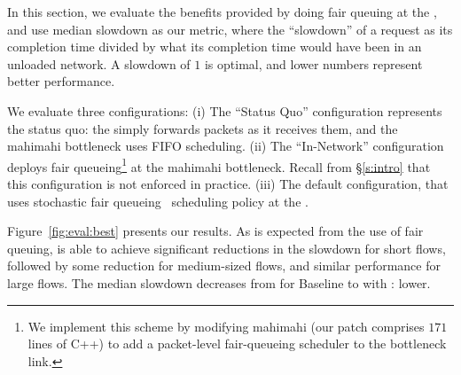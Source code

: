 
\newcommand{\baseline}{Status Quo\xspace}
\newcommand{\optimal}{In-Network\xspace}



In this section, we evaluate the benefits provided by doing fair queuing at the \name, and use median slowdown as our metric, where the ``slowdown'' of a request as its completion time divided by what its completion time would have been in an unloaded network. A slowdown of $1$ is optimal, and lower numbers represent better performance.

We evaluate three configurations: 
(i) The ``\baseline'' configuration represents the status quo: the \inbox simply forwards packets as it receives them, and the mahimahi bottleneck uses FIFO scheduling.
(ii) The ``\optimal'' configuration deploys fair queueing\footnote{
We implement this scheme by modifying mahimahi (our patch comprises $171$ lines of C++) to add a packet-level fair-queueing scheduler to the bottleneck link.}
at the mahimahi bottleneck. 
Recall from \S\ref{s:intro} that this configuration is not enforced in practice.
(iii) The default \name configuration, that uses stochastic fair queueing~\cite{sfq} scheduling policy at the \inbox.


Figure~\ref{fig:eval:best} presents our results. 
As is expected from the use of fair queuing, \name is able to achieve significant reductions in the slowdown for short flows, followed by some reduction for medium-sized flows, and similar performance for large flows. 
The median slowdown
decreases from \overviewBenefitsBaselineMedian 
for Baseline to \overviewBenefitsBundlerMedian 
with \name: \overviewBenefitsBundlerMedianImprovement
lower. 

